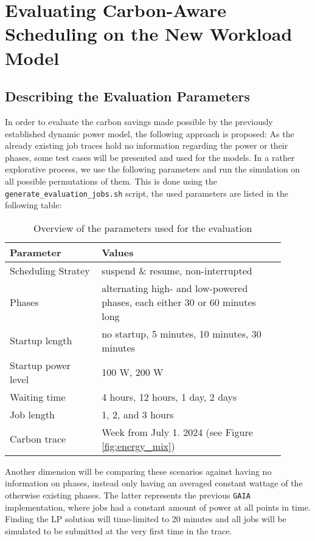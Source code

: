 \chapter{Evaluating Carbon-Aware Scheduling on the New Workload Model} \label{sec:evaluate_scheduling}

\section{Describing the Evaluation Parameters}

In order to evaluate the carbon savings made possible by the previously established dynamic power model, the following approach is proposed:
As the already existing job traces hold no information regarding the power or their phases, some test cases will be presented and used for the models.
In a rather explorative process, we use the following parameters and run the simulation on all possible permutations of them. 
This is done using the \verb|generate_evaluation_jobs.sh| script, the used parameters are listed in the following table:

\begin{table}[h!]
    \centering
    \begin{tabular}{|p{0.3\linewidth}|p{0.6\linewidth}|}
    \hline
        Parameter & Values \\ \hline
        Scheduling Stratey & suspend \& resume, non-interrupted \\ \hline
        Phases & alternating high- and low-powered phases, each either 30 or 60 minutes long \\ \hline
        Startup length & no startup, 5 minutes, 10 minutes, 30 minutes \\ \hline
        Startup power level & 100 W, 200 W \\ \hline
        Waiting time & 4 hours, 12 hours, 1 day, 2 days \\ \hline
        Job length & 1, 2, and 3 hours \\ \hline
        Carbon trace & Week from July 1. 2024 (see Figure \ref{fig:energy_mix}) \\ \hline
    \end{tabular}
    \caption{Overview of the parameters used for the evaluation}
    \label{tab:evaluation_parameters}
    \end{table}

Another dimension will be comparing these scenarios against having no information on phases, instead only having an averaged constant wattage of the otherwise existing phases.
The latter represents the previous \verb|GAIA| implementation, where jobs had a constant amount of power at all points in time.
Finding the LP solution will time-limited to 20 minutes and all jobs will be simulated to be submitted at the very first time in the trace.

